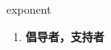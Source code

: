 
\begin{frame}
{\huge exponent}
\begin{center}
\begin{enumerate}\Large
  \item \textbf{倡导者，支持者}
\end{enumerate}
\end{center}
\end{frame}
